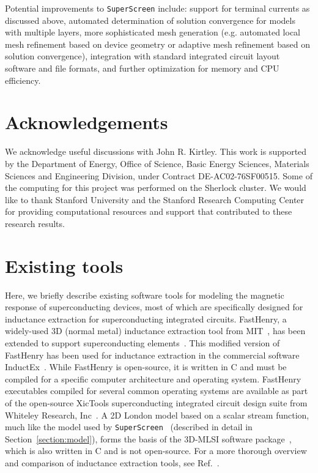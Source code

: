 \documentclass[final,3p,times,twocolumn]{elsarticle}
\newcommand{\inline}[1]{\texttt{#1}\xspace}
\newcommand{\SuperScreen}{\inline{SuperScreen}}
\begin{document}
Potential improvements to \SuperScreen include: support for terminal currents as discussed above, automated determination of solution convergence for models with multiple layers, more sophisticated mesh generation (e.g. automated local mesh refinement based on device geometry or adaptive mesh refinement based on solution convergence), integration with standard integrated circuit layout software and file formats, and further optimization for memory and CPU efficiency.

\section{Acknowledgements}
\label{section:acknowledgements}
We acknowledge useful discussions with John R. Kirtley. This work is supported by the Department of Energy,  Office of Science, Basic Energy Sciences, Materials Sciences and Engineering Division, under Contract DE-AC02-76SF00515. Some of the computing for this project was performed on the Sherlock cluster. We would like to thank Stanford University and the Stanford Research Computing Center for providing computational resources and support that contributed to these research results.




\appendix

\section{Existing tools}
\label{appendix:other-tools}

Here, we briefly describe existing software tools for modeling the magnetic response of superconducting devices, most of which are specifically designed for inductance extraction for superconducting integrated circuits. FastHenry, a widely-used 3D (normal metal) inductance extraction tool from MIT~\cite{Kamon1994-ck}, has been extended to support superconducting elements~\cite{wrcad, XicTools}. This modified version of FastHenry has been used for inductance extraction in the commercial software InductEx~\cite{Fourie2011-wl}. While FastHenry is open-source, it is written in C and must be compiled for a specific computer architecture and operating system. FastHenry executables compiled for several common operating systems are available as part of the open-source XicTools superconducting integrated circuit design suite from Whiteley Research, Inc~\cite{wrcad, XicTools}. A 2D London model based on a scalar stream function, much like the model used by \SuperScreen~\cite{Brandt2004-ew, Brandt2005-wj} (described in detail in Section~\ref{section:model}), forms the basis of the 3D-MLSI software package~\cite{Khapaev1997-kw, Khapaev2001-xq, Khapaev2001-pw}, which is also written in C and is not open-source. For a more thorough overview and comparison of inductance extraction tools, see Ref.~\cite{Gaj1999-ls}.
\end{document}
